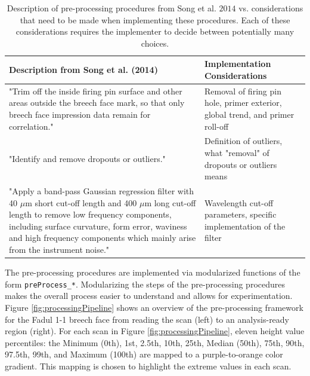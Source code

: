 \renewcommand{\arraystretch}{2}

\begin{table}

\caption{\label{tab:pre-processTable}Description of pre-processing procedures from Song et al. \(2014\) vs. considerations that need to be made when implementing these procedures. Each of these considerations requires the implementer to decide between potentially many choices.}
\centering
\begin{tabu} to 
\toprule
\textbf{Description from Song et al. (2014)} & \textbf{Implementation Considerations}\\
\midrule
"Trim off the inside firing pin surface and other areas outside the breech face mark, so that only breech face impression data remain for correlation." & Removal of firing pin hole, primer exterior, global trend, and primer roll-off\\
"Identify and remove dropouts or outliers." & Definition of outliers, what "removal" of dropouts or outliers means\\
"Apply a band-pass Gaussian regression filter with 40 $\mu$m short cut-off length and 400 $\mu$m long cut-off length to remove low frequency components, including surface curvature, form error, waviness and high frequency components which mainly arise from the instrument noise." & Wavelength cut-off parameters, specific implementation of the filter\\
\bottomrule
\end{tabu}
\end{table}

The pre-processing procedures are implemented via modularized functions of the form \texttt{preProcess\_*}.
Modularizing the steps of the pre-processing procedures makes the overall process easier to understand and allows for experimentation.
Figure \ref{fig:processingPipeline} shows an overview of the pre-processing framework for the Fadul 1-1 breech face from reading the scan (left) to an analysis-ready region (right).
For each scan in Figure \ref{fig:processingPipeline}, eleven height value percentiles: the Minimum (0th), 1st, 2.5th, 10th, 25th, Median (50th), 75th, 90th, 97.5th, 99th, and Maximum (100th) are mapped to a purple-to-orange color gradient.
This mapping is chosen to highlight the extreme values in each scan.

